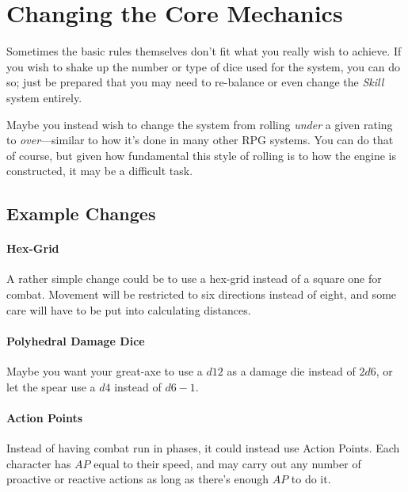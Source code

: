 \section{Changing the Core Mechanics}
Sometimes the basic rules themselves don't fit what you really wish to achieve.
If you wish to shake up the number or type of dice used for the system, you can do so; just be prepared that you may need to re-balance or even change the \textit{Skill} system entirely.

Maybe you instead wish to change the system from rolling \textit{under} a given rating to \textit{over}---similar to how it's done in many other RPG systems.
You can do that of course, but given how fundamental this style of rolling is to how the engine is constructed, it may be a difficult task.

\subsection{Example Changes}
\paragraph{Hex-Grid} A rather simple change could be to use a hex-grid instead of a square one for combat.
Movement will be restricted to six directions instead of eight, and some care will have to be put into calculating distances.

\paragraph{Polyhedral Damage Dice} Maybe you want your great-axe to use a $d12$ as a damage die instead of $2d6$, or let the spear use a $d4$ instead of $d6-1$.

\paragraph{Action Points} Instead of having combat run in phases, it could instead use Action Points.
Each character has $AP$ equal to their speed, and may carry out any number of proactive or reactive actions as long as there's enough $AP$ to do it.